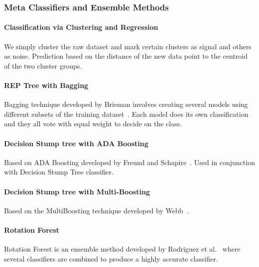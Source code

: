 \subsubsection{Meta Classifiers and Ensemble Methods}

\paragraph{Classification via Clustering and Regression}

We simply cluster the raw dataset and mark certain clusters as signal and others as noise. Prediction based on the distance of the new data point to the centroid of the two cluster groups. 

\paragraph{REP Tree with Bagging}

Bagging technique developed by Brieman involves creating several models using different subsets of the training dataset~\cite{Bagging}. Each model does its own classification and they all vote with equal weight to decide on the class. 


\paragraph{Decision Stump tree with ADA Boosting}

Based on ADA Boosting developed by Freund and Schapire~\cite{ADABoosting}. Used in conjunction with Decision Stump Tree classifier.

\paragraph{Decision Stump tree with Multi-Boosting}

Based on the MultiBoosting technique developed by Webb~\cite{MultiBoosting}.




\paragraph{Rotation Forest}

Rotation Forest is an ensemble method developed by Rodriguez et al.~\cite{RotationForest} where several classifiers are combined to produce a highly accurate classifier. 


